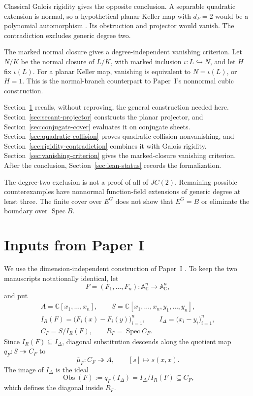 \documentclass[11pt]{article}
\DeclareMathOperator{\Spec}{Spec}\DeclareMathOperator{\Frac}{Frac}
\newcommand{\A}{\mathbb A}
\newcommand{\C}{\mathbb C}
\newcommand{\Obs}{\operatorname{Obs}}
\begin{document}
Classical Galois rigidity gives the opposite conclusion.  A separable
quadratic extension is normal, so a hypothetical planar Keller map with
\(d_F=2\) would be a polynomial automorphism
\cite{Campbell1973,Razar1979,Wright1981}.  Its obstruction and projector
would vanish.  The contradiction excludes generic degree two.

The marked normal closure gives a degree-independent vanishing criterion.
Let \(N/K\) be the normal closure of \(L/K\), with marked inclusion
\(\iota\colon L\hookrightarrow N\), and let \(H\) fix \(\iota(L)\).
For a planar Keller map, vanishing is equivalent to \(N=\iota(L)\), or
\(H=1\).  This is the normal-branch counterpart to Paper~I's nonnormal
cubic construction.

Section~\ref{sec:collision-inputs} recalls, without reproving, the general
construction needed here.  Section~\ref{sec:secant-projector} constructs
the planar projector, and Section~\ref{sec:conjugate-cover} evaluates it on
conjugate sheets.  Section~\ref{sec:quadratic-collision} proves
quadratic collision nonvanishing, and
Section~\ref{sec:rigidity-contradiction} combines it with Galois rigidity.
Section~\ref{sec:vanishing-criterion} gives the marked-closure vanishing
criterion.  After the conclusion, Section~\ref{sec:lean-status} records
the formalization.

The degree-two exclusion is not a proof of all of \(JC(2)\).  Remaining
possible counterexamples have nonnormal function-field extensions of
generic degree at least three.  The finite cover over \(E^G\) does not
show that \(E^G=B\) or eliminate the boundary over \(\Spec B\).

\section{Inputs from Paper I}
\label{sec:collision-inputs}

We use the dimension-independent construction of Paper~I
\cite{VanDerVlugt2026CubicCollision}.  To keep the two manuscripts
notationally identical, let
\[
  F=(F_1,\dots,F_n)\colon\A^n_{\C}\longrightarrow\A^n_{\C},
\]
and put
\[
  \begin{gathered}
  A=\C[x_1,\dots,x_n],\qquad
  S=\C[x_1,\dots,x_n,y_1,\dots,y_n],\\
  I_R(F)=\bigl(F_i(x)-F_i(y)\bigr)_{i=1}^n,\qquad
  I_\Delta=\bigl(x_i-y_i\bigr)_{i=1}^n,\\
  C_F=S/I_R(F),\qquad
  R_F=\Spec C_F.
  \end{gathered}
\]
Since \(I_R(F)\subseteq I_\Delta\), diagonal substitution descends along
the quotient map \(q_F\colon S\twoheadrightarrow C_F\) to
\[
  \bar\mu_F\colon C_F\twoheadrightarrow A,
  \qquad [s]\longmapsto s(x,x).
\]
The image of \(I_\Delta\) is the ideal
\[
  \Obs(F):=q_F(I_\Delta)=I_\Delta/I_R(F)\subseteq C_F,
\]
which defines the diagonal inside \(R_F\).
\end{document}
